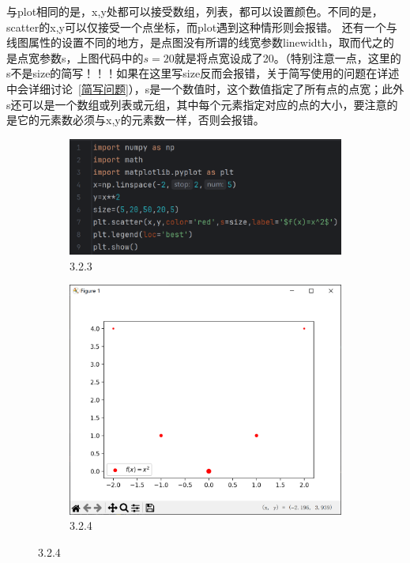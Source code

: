 \documentclass[12pt]{article}
\begin{document}
与plot相同的是，x,y处都可以接受数组，列表，都可以设置颜色。不同的是，scatter的x,y可以仅接受一个点坐标，而plot遇到这种情形则会报错。
还有一个与线图属性的设置不同的地方，是点图没有所谓的线宽参数linewidth，取而代之的是点宽参数s，上图代码中的\(s=20\)就是将点宽设成了20。（特别注意一点，这里的s不是size的简写！！！如果在这里写size反而会报错，关于简写使用的问题在详述中会详细讨论~\ref{简写问题}），s是一个数值时，这个数值指定了所有点的点宽；此外s还可以是一个数组或列表或元组，其中每个元素指定对应的点的大小，要注意的是它的元素数必须与x,y的元素数一样，否则会报错。


\begin{figure}[H]
    \centering
    \begin{subfigure}[b]{0.5\textwidth}
        \includegraphics[width=\textwidth]{点图program2.png} %
        \caption{3.2.3}
        \label{fig:line-graph2}
    \end{subfigure}
    \hfill
    \begin{subfigure}[b]{0.45\textwidth}
        \includegraphics[width=\textwidth]{点图Pic2.png} %
        \caption{3.2.4}
        \label{fig:line-graph2-pic2}
    \end{subfigure}
\end{figure}
\end{document}
